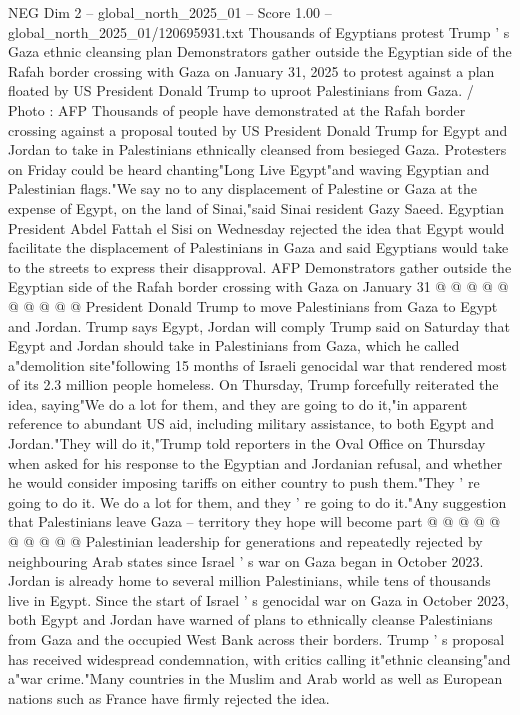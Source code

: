 \begin{textsample}{NEG Dim 2 – global\_north\_2025\_01 – Score 1.00 – global\_north\_2025\_01/120695931.txt}  \label{ex:f2_neg_051}
Thousands of Egyptians protest Trump ' s Gaza ethnic cleansing plan Demonstrators gather outside the Egyptian side of the Rafah border crossing with Gaza on January 31, 2025 to protest against a plan floated by US President Donald Trump to uproot Palestinians from Gaza. / Photo : AFP Thousands of people have demonstrated at the Rafah border crossing against a proposal touted by US President Donald Trump for Egypt and Jordan to take in Palestinians ethnically cleansed from besieged Gaza.
Protesters on Friday could be heard chanting"Long Live Egypt"and waving Egyptian and Palestinian flags."We say no to any displacement of Palestine or Gaza at the expense of Egypt, on the land of Sinai,"said Sinai resident Gazy Saeed.
Egyptian President Abdel Fattah el Sisi on Wednesday rejected the idea that Egypt would facilitate the displacement of Palestinians in Gaza and said Egyptians would take to the streets to express their disapproval.
AFP Demonstrators gather outside the Egyptian side of the Rafah border crossing with Gaza on January 31 @ @ @ @ @ @ @ @ @ @ President Donald Trump to move Palestinians from Gaza to Egypt and Jordan.
Trump says Egypt, Jordan will comply Trump said on Saturday that Egypt and Jordan should take in Palestinians from Gaza, which he called a"demolition site"following 15 months of Israeli genocidal war that rendered most of its 2.3 million people homeless.
On Thursday, Trump forcefully reiterated the idea, saying"We do a lot for them, and they are going to do it,"in apparent reference to abundant US aid, including military assistance, to both Egypt and Jordan."They will do it,"Trump told reporters in the Oval Office on Thursday when asked for his response to the Egyptian and Jordanian refusal, and whether he would consider imposing tariffs on either country to push them."They ' re going to do it.
We do a lot for them, and they ' re going to do it."Any suggestion that Palestinians leave Gaza -- territory they hope will become part @ @ @ @ @ @ @ @ @ @ Palestinian leadership for generations and repeatedly rejected by neighbouring Arab states since Israel ' s war on Gaza began in October 2023.
Jordan is already home to several million Palestinians, while tens of thousands live in Egypt.
Since the start of Israel ' s genocidal war on Gaza in October 2023, both Egypt and Jordan have warned of plans to ethnically cleanse Palestinians from Gaza and the occupied West Bank across their borders.
Trump ' s proposal has received widespread condemnation, with critics calling it"ethnic cleansing"and a"war crime."Many countries in the Muslim and Arab world as well as European nations such as France have firmly rejected the idea.

\end{textsample}

